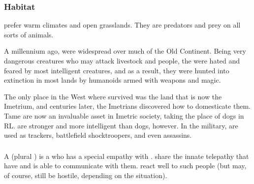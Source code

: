 
\subsubsection{Habitat}
\Nycans{} prefer warm climates and open grasslands. They are predators and prey on all sorts of animals. 

A millennium ago, \nycans{} were widespread over much of the Old Continent. Being very dangerous creatures who may attack livestock and people, the \nycans{} were hated and feared by most intelligent creatures, and as a result, they were hunted into extinction in most lands by humanoids armed with weapons and magic. 

The only place in the West where \nycans{} survived was the land that is now the Imetrium, and centuries later, the Imetrians discovered how to domesticate them. Tame \nycans{} are now an invaluable asset in Imetric society, taking the place of dogs in RL. \Nycans{} are stronger and more intelligent than dogs, however. In the military, \nycans{} are used as trackers, battlefield shocktroopers, and even assassins. 

\subsubsection{\Nycaneers{}}
\label{Nycaneer}
\label{Nycaneers}
\index{\nycaneer}


A \nycaneer{} (plural \emph{\nycaneers{}}) is a \scatha{} who has a special empathy with \nycans{}. \Nycaneers{} share the innate telepathy that \nycans{} have and is able to communicate with them. \Nycans{} react well to such people (but may, of course, still be hostile, depending on the situation). 

